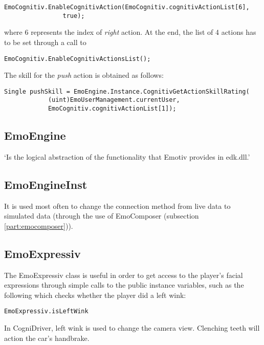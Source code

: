 \begin{Verbatim}[frame=single, framesep=3mm]
EmoCognitiv.EnableCognitivAction(EmoCognitiv.cognitivActionList[6], 
				true);
\end{Verbatim}
		
where 6 represents the index of \textit{right} action. At the end, the list of 4 actions has to be set through a call to 

\begin{Verbatim}[frame=single, framesep=3mm]
EmoCognitiv.EnableCognitivActionsList();
\end{Verbatim}

The skill for the \textit{push} action is obtained as follows:

\begin{Verbatim}[frame=single, framesep=3mm]
Single pushSkill = EmoEngine.Instance.CognitivGetActionSkillRating(
			(uint)EmoUserManagement.currentUser,
			EmoCognitiv.cognitivActionList[1]); 
\end{Verbatim}

\subsection{EmoEngine}
`Is the logical abstraction of the functionality that Emotiv provides in edk.dll.'\cite{emotivSDKUserManual}

\subsection{EmoEngineInst}
It is used most often to change the connection method from live data to simulated data (through the use of EmoComposer (subsection \ref{part:emocomposer})).

\subsection{EmoExpressiv}
The EmoExpressiv class is useful in order to get access to the player's facial expressions through simple calls to the public instance variables, such as the following which checks whether the player did a left wink:

\begin{Verbatim}[frame=single, framesep=3mm]
EmoExpressiv.isLeftWink
\end{Verbatim}

In CogniDriver, left wink is used to change the camera view. Clenching teeth will action the car's handbrake. 

